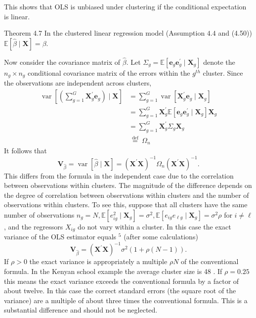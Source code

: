 \documentclass[10pt]{article}
\begin{document}
This shows that OLS is unbiased under clustering if the conditional expectation is linear.

Theorem 4.7 In the clustered linear regression model (Assumption $4.4$ and (4.50)) $\mathbb{E}[\widehat{\beta} \mid \boldsymbol{X}]=\beta$.

Now consider the covariance matrix of $\widehat{\beta}$. Let $\Sigma_{g}=\mathbb{E}\left[\boldsymbol{e}_{g} \boldsymbol{e}_{g}^{\prime} \mid \boldsymbol{X}_{g}\right]$ denote the $n_{g} \times n_{g}$ conditional covariance matrix of the errors within the $g^{t h}$ cluster. Since the observations are independent across clusters,
$$
\begin{aligned}
\operatorname{var}\left[\left(\sum_{g=1}^{G} \boldsymbol{X}_{g}^{\prime} \boldsymbol{e}_{g}\right) \mid \boldsymbol{X}\right] &=\sum_{g=1}^{G} \operatorname{var}\left[\boldsymbol{X}_{g}^{\prime} \boldsymbol{e}_{g} \mid \boldsymbol{X}_{g}\right] \\
&=\sum_{g=1}^{G} \boldsymbol{X}_{g}^{\prime} \mathbb{E}\left[\boldsymbol{e}_{g} \boldsymbol{e}_{g}^{\prime} \mid \boldsymbol{X}_{g}\right] \boldsymbol{X}_{g} \\
&=\sum_{g=1}^{G} \boldsymbol{X}_{g}^{\prime} \Sigma_{g} \boldsymbol{X}_{g} \\
& \stackrel{\text { def }}{=} \Omega_{n}
\end{aligned}
$$
It follows that
$$
\boldsymbol{V}_{\widehat{\beta}}=\operatorname{var}[\widehat{\beta} \mid \boldsymbol{X}]=\left(\boldsymbol{X}^{\prime} \boldsymbol{X}\right)^{-1} \Omega_{n}\left(\boldsymbol{X}^{\prime} \boldsymbol{X}\right)^{-1} .
$$
This differs from the formula in the independent case due to the correlation between observations within clusters. The magnitude of the difference depends on the degree of correlation between observations within clusters and the number of observations within clusters. To see this, suppose that all clusters have the same number of observations $n_{g}=N, \mathbb{E}\left[e_{i g}^{2} \mid \boldsymbol{X}_{g}\right]=\sigma^{2}, \mathbb{E}\left[e_{i g} e_{\ell g} \mid \boldsymbol{X}_{g}\right]=\sigma^{2} \rho$ for $i \neq \ell$, and the regressors $X_{i g}$ do not vary within a cluster. In this case the exact variance of the OLS estimator equals ${ }^{5}$ (after some calculations)
$$
\boldsymbol{V}_{\widehat{\beta}}=\left(\boldsymbol{X}^{\prime} \boldsymbol{X}\right)^{-1} \sigma^{2}(1+\rho(N-1)) .
$$
If $\rho>0$ the exact variance is appropriately a multiple $\rho N$ of the conventional formula. In the Kenyan school example the average cluster size is 48 . If $\rho=0.25$ this means the exact variance exceeds the conventional formula by a factor of about twelve. In this case the correct standard errors (the square root of the variance) are a multiple of about three times the conventional formula. This is a substantial difference and should not be neglected.
\end{document}
